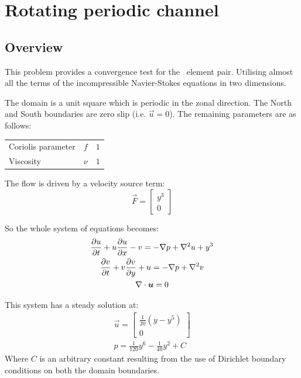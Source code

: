 
\section{Rotating periodic channel}
\label{sec:periodic_channel}

\subsection{Overview}

This problem provides a convergence test for the \PoDGPt\ element pair.
Utilising almost all the terms of the incompressible Navier-Stokes equations
in two dimensions.

The domain is a unit square which is periodic in the zonal direction. The
North and South boundaries are zero slip (i.e. $\vec{u}=0$). The remaining
parameters are as follows:

\begin{tabular}{lll}
  Coriolis parameter & $f$ & $1$ \\
  Viscosity & $\nu$ & $1$ 
\end{tabular}

The flow is driven by a velocity source term:
\begin{equation}
  \vec{F}=
  \begin{bmatrix}
    y^3 \\
    0
  \end{bmatrix}
\end{equation}

So the whole system of equations becomes:
\begin{gather}
  \ppt{u}+u\ppt[x]{u}-v=-\grad p + \grad^2 u +y^3\\
  \ppt{v}+v\ppt[y]{v}+u=-\grad p + \grad^2 v\\
  \div\vec{u}=0
\end{gather}

This system has a steady solution at:
\begin{gather}
  \vec{u}=
  \begin{bmatrix}
    \frac{1}{20}(y-y^5)\\
    0
  \end{bmatrix}\\
  p=\frac{1}{120}y^6-\frac{1}{40}y^2+C
\end{gather}
Where $C$ is an arbitrary constant resulting from the use of Dirichlet
boundary conditions on both the domain boundaries.

